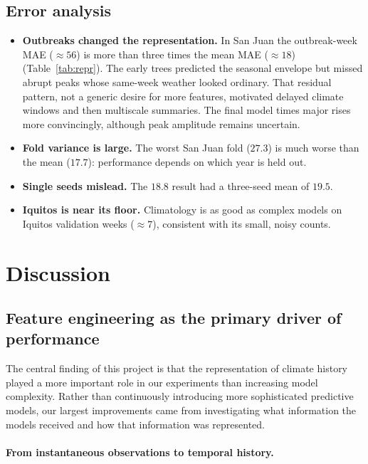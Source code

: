 \documentclass[11pt,a4paper]{article}
\begin{document}
\subsection{Error analysis}
\begin{itemize}
  \item \textbf{Outbreaks changed the representation.} In San Juan the outbreak-week MAE ($\approx 56$) is more than three times the mean MAE ($\approx 18$) (Table~\ref{tab:repr}). The early trees predicted the seasonal envelope but missed abrupt peaks whose same-week weather looked ordinary. That residual pattern, not a generic desire for more features, motivated delayed climate windows and then multiscale summaries. The final model times major rises more convincingly, although peak amplitude remains uncertain.
  \item \textbf{Fold variance is large.} The worst San Juan fold ($27.3$) is much worse than the mean ($17.7$): performance depends on which year is held out.
  \item \textbf{Single seeds mislead.} The $18.8$ result had a three-seed mean of $19.5$.
  \item \textbf{Iquitos is near its floor.} Climatology is as good as complex models on Iquitos validation weeks ($\approx 7$), consistent with its small, noisy counts.
\end{itemize}


\section{Discussion}

\subsection{Feature engineering as the primary driver of performance}

The central finding of this project is that the representation
of climate history played a more important role in our
experiments than increasing model complexity.
Rather than continuously introducing more sophisticated
predictive models, our largest improvements came from
investigating what information the models received
and how that information was represented.

\paragraph{From instantaneous observations to temporal history.}
\end{document}
